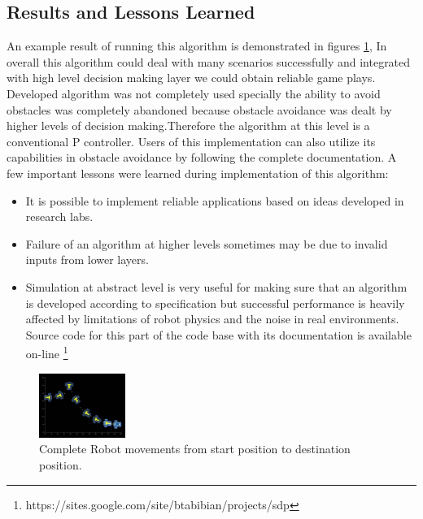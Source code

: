\documentclass[conference,12pt]{IEEEtran}
\begin{document}
\subsection{Results and Lessons Learned}
An example result of running this algorithm is demonstrated in figures \ref{fig:seq}, In overall this algorithm could deal with many scenarios successfully and integrated with high level decision making layer we could obtain reliable game plays.
Developed algorithm was not completely used specially the ability to avoid obstacles was completely abandoned because obstacle avoidance was dealt by higher levels of decision making.Therefore the algorithm at this level is a conventional P controller. Users of this implementation can also utilize its capabilities in obstacle avoidance by following the complete documentation.
A few important lessons were learned during implementation of this algorithm:
\begin{itemize}
\item It is possible to implement reliable applications based on ideas developed in research labs.
\item Failure of an algorithm at higher levels sometimes may be due to invalid inputs from lower layers.
\item Simulation at abstract level is very useful for making sure that an algorithm is developed according to specification but successful performance is heavily affected by limitations of robot physics and the noise in real environments. Source code for this part of the code base with its documentation is available on-line \footnote{https://sites.google.com/site/btabibian/projects/sdp}
\end{itemize}   
\begin{figure}[htp]
\begin{center}
\includegraphics[width=0.25\textwidth] {Final.jpg}
\caption{Complete Robot movements from start position to destination position.}
\label{fig:seq}
\end{center}
\end{figure}
\end{document}
